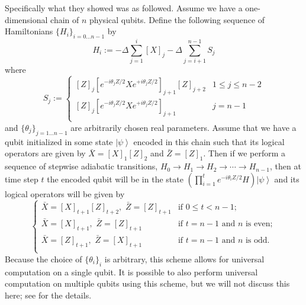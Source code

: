 \documentclass[12pt]{amsbook}
\theoremstyle{plain}
\theoremstyle{definition}
\theoremstyle{remark}
\newcommand{\ket}[1]{\left|#1\right>}
\newcommand{\paren}[1]{\left(#1\right)}
\begin{document}
Specifically what they showed was as followed.  Assume we have a one-dimensional chain of $n$ physical qubits.  Define the following sequence of Hamiltonians $\{H_i\}_{i=0\dots n-1}$ by
$$H_i := -\Delta\sum_{j=1}^{i} [X]_j - \Delta\sum_{j=i+1}^{n-1} S_j$$
where
$$S_j :=
\begin{cases}
[Z]_j\left[e^{-i\theta_jZ/2}Xe^{+i\theta_jZ/2}\right]_{j+1}[Z]_{j+2} & 1 \le j \le n-2 \\
[Z]_j\left[e^{-i\theta_jZ/2}Xe^{+i\theta_jZ/2}\right]_{j+1} & j = n-1 \\
\end{cases}
$$
and $\{\theta_j\}_{j=1\dots n-1}$ are arbitrarily chosen real parameters.  Assume that we have a qubit initialized in some state $\ket{\psi}$ encoded in this chain such that its logical operators are given by $\bar X = [X]_1[Z]_2$ and $\bar Z = [Z]_1$.  Then if we perform a sequence of stepwise adiabatic transitions, $H_0\to H_1\to H_2\to \cdots \to H_{n-1}$, then at time step $t$ the encoded qubit will be in the state $\paren{\prod_{i=1}^te^{-i\theta_iZ/2}H}\ket{\psi}$ and its logical operators will be given by
$$
\begin{cases}
\bar X = [X]_{t+1}[Z]_{t+2},\,\, \bar Z = [Z]_{t+1} & \text{if}\,\,0 \le t < n-1; \\
\bar X = [X]_{t+1},\,\, \bar Z = [Z]_{t+1} & \text{if}\,\,t = n-1\,\,\text{and}\,\,n\,\,\text{is even}; \\
\bar X = [Z]_{t+1},\,\, \bar Z = [X]_{t+1} & \text{if}\,\,t = n-1\,\,\text{and}\,\,n\,\,\text{is odd}. \\
\end{cases}
$$
Because the choice of $\{\theta_i\}_i$ is arbitrary, this scheme allows for universal computation on a single qubit.  It is possible to also perform universal computation on multiple qubits using this scheme, but we will not discuss this here;  see \cite{Bacon2009} for the details.
\end{document}
